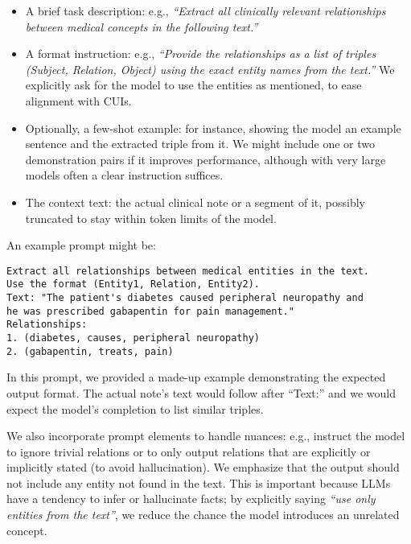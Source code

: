 \begin{itemize}
\item A brief task description: e.g., \textit{``Extract all clinically relevant relationships between medical concepts in the following text.''}
\item A format instruction: e.g., \textit{``Provide the relationships as a list of triples (Subject, Relation, Object) using the exact entity names from the text.''} We explicitly ask for the model to use the entities as mentioned, to ease alignment with CUIs.
\item Optionally, a few-shot example: for instance, showing the model an example sentence and the extracted triple from it. We might include one or two demonstration pairs if it improves performance, although with very large models often a clear instruction suffices.
\item The context text: the actual clinical note or a segment of it, possibly truncated to stay within token limits of the model.
\end{itemize}

An example prompt might be:

\begin{verbatim}
Extract all relationships between medical entities in the text. 
Use the format (Entity1, Relation, Entity2).
Text: "The patient's diabetes caused peripheral neuropathy and 
he was prescribed gabapentin for pain management."
Relationships:
1. (diabetes, causes, peripheral neuropathy)
2. (gabapentin, treats, pain)
\end{verbatim}

In this prompt, we provided a made-up example demonstrating the expected output format. The actual note's text would follow after ``Text:'' and we would expect the model's completion to list similar triples.

We also incorporate prompt elements to handle nuances: e.g., instruct the model to ignore trivial relations or to only output relations that are explicitly or implicitly stated (to avoid hallucination). We emphasize that the output should not include any entity not found in the text. This is important because LLMs have a tendency to infer or hallucinate facts; by explicitly saying \textit{``use only entities from the text''}, we reduce the chance the model introduces an unrelated concept.

